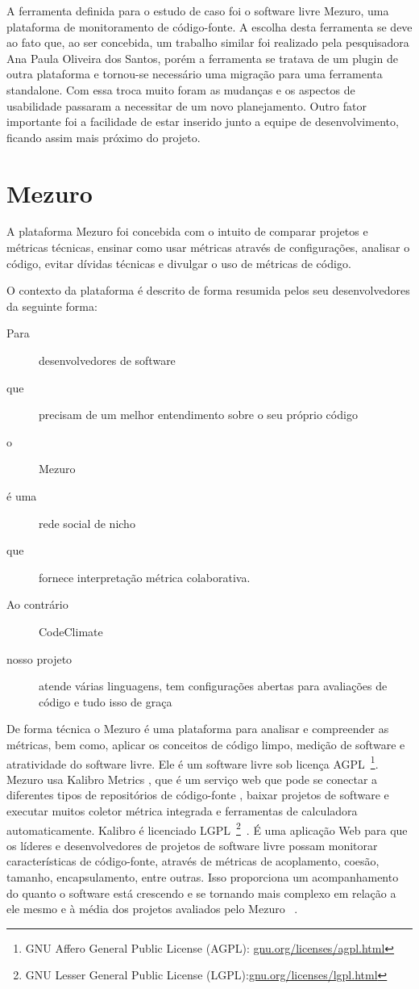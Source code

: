 A ferramenta definida para o estudo de caso foi o software livre Mezuro, uma plataforma de monitoramento de código-fonte. A escolha desta ferramenta se deve ao fato que, ao ser concebida, um trabalho similar foi realizado pela pesquisadora Ana Paula Oliveira dos Santos, porém a ferramenta se tratava de um plugin de outra plataforma e tornou-se necessário uma migração para uma ferramenta standalone. Com essa troca muito foram as mudanças e os aspectos de usabilidade passaram a necessitar de um novo planejamento. Outro fator importante foi a facilidade de estar inserido junto a equipe de desenvolvimento, ficando assim mais próximo do projeto.

\section{Mezuro}
\label{mezuro}

A plataforma Mezuro foi concebida com o intuito de comparar projetos e métricas técnicas,
ensinar como usar métricas através de configurações, analisar o código, evitar dívidas técnicas e divulgar o uso de métricas de código.

O contexto da plataforma é descrito de forma resumida pelos seu desenvolvedores da seguinte forma:
\begin{description}
\item[Para] desenvolvedores de software
\item[que] precisam de um melhor entendimento sobre o seu próprio código
\item[o] Mezuro
\item[é uma] rede social de nicho
\item[que] fornece interpretação métrica colaborativa.
\item[Ao contrário] CodeClimate
\item[nosso projeto] atende várias linguagens, tem configurações abertas para avaliações de código e tudo isso de graça
\end{description}

De forma técnica o Mezuro é uma plataforma para analisar e compreender as métricas, bem como, aplicar os conceitos de código limpo, medição de software e atratividade do software livre. Ele é um software livre sob licença AGPL~\footnote{GNU Affero General Public License (AGPL): \url{gnu.org/licenses/agpl.html}}. Mezuro usa Kalibro Metrics , que é um serviço web que pode se conectar a diferentes tipos de repositórios de código-fonte , baixar projetos de software e executar muitos coletor métrica integrada e ferramentas de calculadora automaticamente. Kalibro é licenciado LGPL~\footnote{GNU Lesser General Public License (LGPL):\url{gnu.org/licenses/lgpl.html}}~\cite{mezuro2012}.
É uma aplicação Web para que os líderes e desenvolvedores de projetos de software livre possam monitorar características de código-fonte, através de métricas de acoplamento, coesão, tamanho, encapsulamento, entre outras. Isso proporciona um acompanhamento do quanto o software está crescendo e se tornando mais complexo em relação a ele mesmo e à média dos projetos avaliados pelo Mezuro~\cite{santos2012}
.

